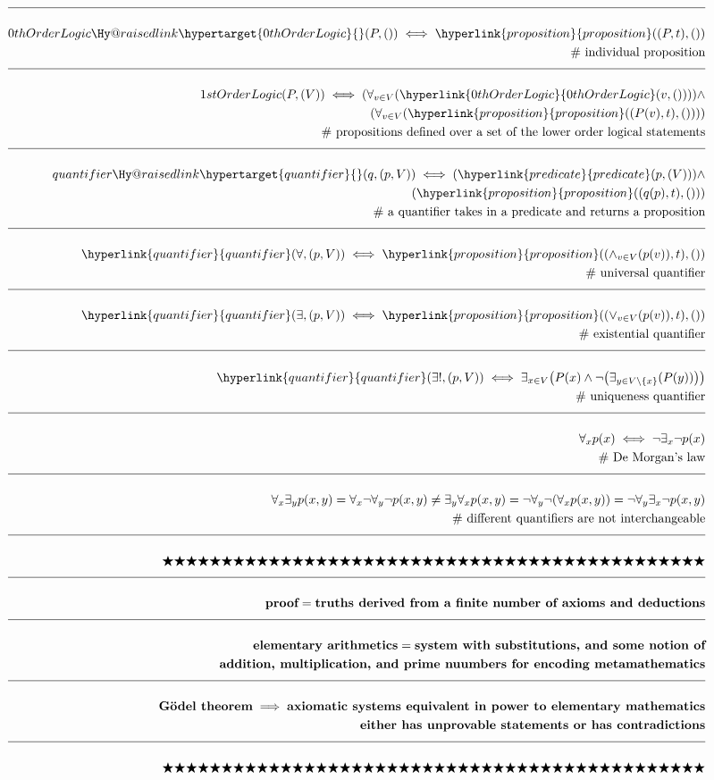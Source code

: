 \documentclass[a4paper]{article}
\makeatletter
\def\ml{\mleft}
\def\mr{\mright}
\newcommand{\melazy}{\bigstar\bigstar\bigstar\bigstar\bigstar\bigstar\bigstar\bigstar\bigstar\bigstar\bigstar\bigstar\bigstar\bigstar\bigstar\bigstar\bigstar\bigstar\bigstar\bigstar\bigstar\bigstar\bigstar\bigstar\bigstar\bigstar\bigstar\bigstar\bigstar\bigstar\bigstar\bigstar\bigstar\bigstar\bigstar\bigstar\bigstar\bigstar\bigstar\bigstar\bigstar\bigstar\bigstar\bigstar\bigstar\bigstar}
\newcommand{\eqComment}[1]{\text{  \# #1}}
\newcommand{\n}{\\[1.5ex] \hline \nonumber \\[0ex]}
\newcommand{\m}{\nonumber \\}
\newcommand{\labeltarget}[1]{\Hy@raisedlink{\hypertarget{#1}{}}}
\newcommand{\dfn}[1]{#1\labeltarget{#1}}
\newcommand{\rfr}[1]{\hyperlink{#1}{#1}}
\makeatother
\begin{document}
\begin{tcolorbox}
\begin{align}
\n \dfn{0thOrderLogic}\ml(P, \ml(\mr)\mr) \iff \rfr{proposition}\ml(\ml(P, t\mr), \ml(\mr)\mr)
\m \eqComment{individual proposition}
\n 1stOrderLogic\ml(P, \ml(V\mr)\mr) \iff \ml(\forall_{v \in V} \ml(\rfr{0thOrderLogic}\ml(v, \ml(\mr)\mr)\mr)\mr) \land
\m \ml(\forall_{v \in V} \ml(\rfr{proposition}\ml(\ml(P\ml(v\mr), t\mr), \ml(\mr)\mr)\mr)\mr)
\m \eqComment{propositions defined over a set of the lower order logical statements}
\n \dfn{quantifier}\ml(q, \ml(p, V\mr)\mr) \iff \ml(\rfr{predicate}\ml(p, \ml(V\mr)\mr)\mr) \land 
\m \ml(\rfr{proposition}\ml(\ml(q\ml(p\mr), t\mr), \ml(\mr)\mr)\mr)
\m \eqComment{a quantifier takes in a predicate and returns a proposition}
\n \rfr{quantifier}\ml(\forall, \ml(p, V\mr)\mr) \iff \rfr{proposition}\ml(\ml(\land_{v \in V} \ml(p\ml(v\mr)\mr), t\mr), \ml(\mr)\mr)
\m \eqComment{universal quantifier}
\n \rfr{quantifier}\ml(\exists, \ml(p, V\mr)\mr) \iff \rfr{proposition}\ml(\ml(\lor_{v \in V} \ml(p\ml(v\mr)\mr), t\mr), \ml(\mr)\mr)
\m \eqComment{existential quantifier}
\n \rfr{quantifier}\ml(\exists!, \ml(p, V\mr)\mr) \iff \exists_{x \in V} \ml(P\ml(x\mr) \land \lnot \ml(\exists_{y \in V \setminus \{x\}} \ml(P\ml(y\mr)\mr)\mr)\mr)
\m \eqComment{uniqueness quantifier}
\n \forall_{x} p\ml(x\mr) \iff \lnot \exists_{x} \lnot p\ml(x\mr)
\m \eqComment{De Morgan's law}
\n \forall_x \exists_y p\ml(x, y\mr) = \forall_x \lnot \forall_y \lnot p\ml(x, y\mr) \neq \exists_y \forall_x p\ml(x, y\mr) = \lnot \forall_y \lnot \ml(\forall_x p\ml(x, y\mr)\mr) = \lnot \forall_y \exists_x \lnot p\ml(x, y\mr)
\m \eqComment{different quantifiers are not interchangeable}
\n \melazy
\n \textbf{proof} = \textbf{truths derived from a finite number of axioms and deductions}
\n \textbf{elementary arithmetics} = \textbf{system with substitutions, and some notion of}
\m \textbf{addition, multiplication, and prime nuumbers for encoding metamathematics}
\n \textbf{G\"odel theorem} \implies \textbf{axiomatic systems equivalent in power to elementary mathematics}
\m \textbf{either has unprovable statements or has contradictions}
\n \melazy
\end{align}
\end{tcolorbox}
\end{document}
